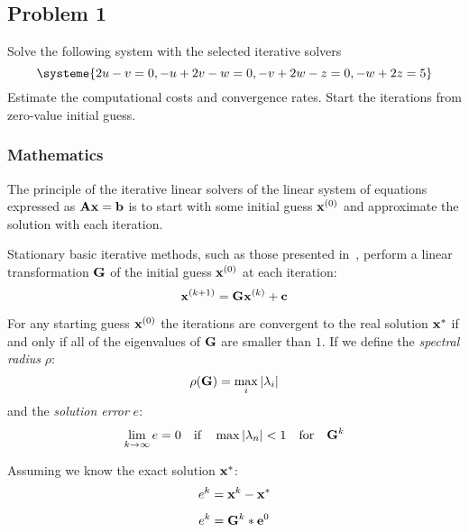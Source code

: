 \subsection{Problem 1}%
\label{sec:problem_1}
Solve the following system with the selected iterative solvers
\begin{equation*}
  \systeme{2u-v=0,-u+2v-w=0,-v+2w-z=0,-w+2z=5}
\end{equation*}
Estimate the computational costs and convergence rates.
Start the iterations from zero-value initial guess.
\subsubsection*{Mathematics}
The principle of the iterative linear solvers of the linear system of equations
expressed as $\mathbf{A}\mathbf{x}=\mathbf{b}$ is to start with some initial guess
$\mathbf{x}^{(0)}$ and approximate the solution with each iteration.

Stationary basic iterative methods, such as those presented in~,
perform a linear transformation $\mathbf{G}$ of the initial guess $\mathbf{x}^{(0)}$ at each
iteration:
\begin{equation*}
  \mathbf{x}^{(k+1)} = \mathbf{G}\mathbf{x}^{(k)} + \mathbf{c}
\end{equation*}

For any starting guess $\mathbf{x}^{(0)}$ the iterations are convergent to the real
solution $\mathbf{x}^{*}$ if and only if all of the eigenvalues of $\mathbf{G}$ are smaller
than $1$.
If we define the \textit{spectral radius} $\rho$:
\begin{equation*}
  \rho(\mathbf{G}) = \max_i{\lvert\lambda_i\rvert}
\end{equation*}
and the \textit{solution error} $e$:
\begin{equation*}
  \lim_{k\to\infty}{e} = 0
  \quad \text{if} \quad
  \max{\lvert\lambda_n\rvert}<1
  \quad \text{for} \quad
  \mathbf{G}^{k}
\end{equation*}

Assuming we know the exact solution $\mathbf{x}^*$:
\begin{equation*}
  e^k = \mathbf{x}^k - \mathbf{x}^*
\end{equation*}

\begin{equation}
  e^k = \mathbf{G}^k * \mathbf{e}^0
\end{equation}

